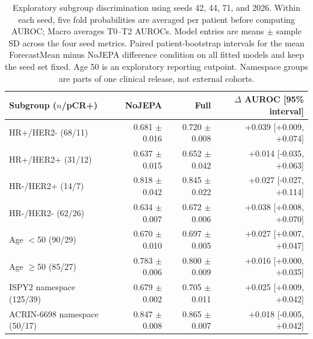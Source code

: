 \begin{table}[t]
\centering
\small
\caption{Exploratory subgroup discrimination using seeds 42, 44, 71, and 2026. Within each seed, five fold probabilities are averaged per patient before computing AUROC; Macro averages T0--T2 AUROCs. Model entries are means $\pm$ sample SD across the four seed metrics. Paired patient-bootstrap intervals for the mean ForecastMean minus NoJEPA difference condition on all fitted models and keep the seed set fixed. Age 50 is an exploratory reporting cutpoint. Namespace groups are parts of one clinical release, not external cohorts.}
\label{tab:subgroups}
\begin{tabular}{lrrr}
\toprule
Subgroup ($n$/pCR+) & NoJEPA & Full & $\Delta$ AUROC [95\% interval] \\
\midrule
HR+/HER2- (68/11) & 0.681 $\pm$ 0.016 & 0.720 $\pm$ 0.008 & +0.039 [+0.009, +0.074] \\
HR+/HER2+ (31/12) & 0.637 $\pm$ 0.015 & 0.652 $\pm$ 0.042 & +0.014 [-0.035, +0.063] \\
HR-/HER2+ (14/7) & 0.818 $\pm$ 0.042 & 0.845 $\pm$ 0.022 & +0.027 [-0.027, +0.114] \\
HR-/HER2- (62/26) & 0.634 $\pm$ 0.007 & 0.672 $\pm$ 0.006 & +0.038 [+0.008, +0.070] \\
Age $<$50 (90/29) & 0.670 $\pm$ 0.010 & 0.697 $\pm$ 0.005 & +0.027 [+0.007, +0.047] \\
Age $\geq$50 (85/27) & 0.783 $\pm$ 0.006 & 0.800 $\pm$ 0.009 & +0.016 [+0.000, +0.035] \\
ISPY2 namespace (125/39) & 0.679 $\pm$ 0.002 & 0.705 $\pm$ 0.011 & +0.025 [+0.009, +0.042] \\
ACRIN-6698 namespace (50/17) & 0.847 $\pm$ 0.008 & 0.865 $\pm$ 0.007 & +0.018 [-0.005, +0.042] \\
\bottomrule
\end{tabular}
\end{table}
